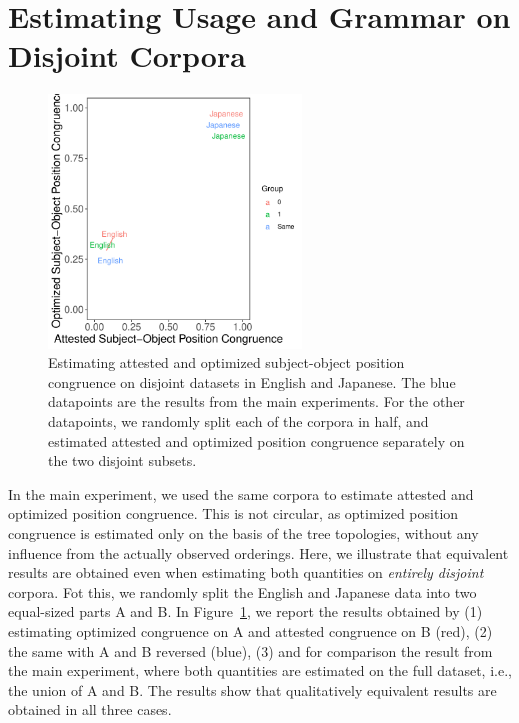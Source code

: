\documentclass[11pt,a4paper]{article}
\begin{document}

\section{Estimating Usage and Grammar on Disjoint Corpora}


\begin{figure}
	\begin{center}
\includegraphics[width=0.6\textwidth]{../disjoint/plane-disjoint.pdf}
	\end{center}
	\caption{Estimating attested and optimized subject-object position congruence on disjoint datasets in English and Japanese. The blue datapoints are the results from the main experiments. For the other datapoints, we randomly split each of the corpora in half, and estimated attested and optimized position congruence separately on the two disjoint subsets.}\label{fig:disjoint}
\end{figure}

In the main experiment, we used the same corpora to estimate attested and optimized position congruence.
This is not circular, as optimized position congruence is estimated only on the basis of the tree topologies, without any influence from the actually observed orderings.
Here, we illustrate that equivalent results are obtained even when estimating both quantities on \emph{entirely disjoint} corpora.
Fot this, we randomly split the English and Japanese data into two equal-sized parts A and B.
In Figure~\ref{fig:disjoint}, we report the results obtained by (1) estimating optimized congruence on A and attested congruence on B (red), (2) the same with A and B reversed (blue), (3) and for comparison the result from the main experiment, where both quantities are estimated on the full dataset, i.e., the union of A and B.
The results show that qualitatively equivalent results are obtained in all three cases.
\end{document}
